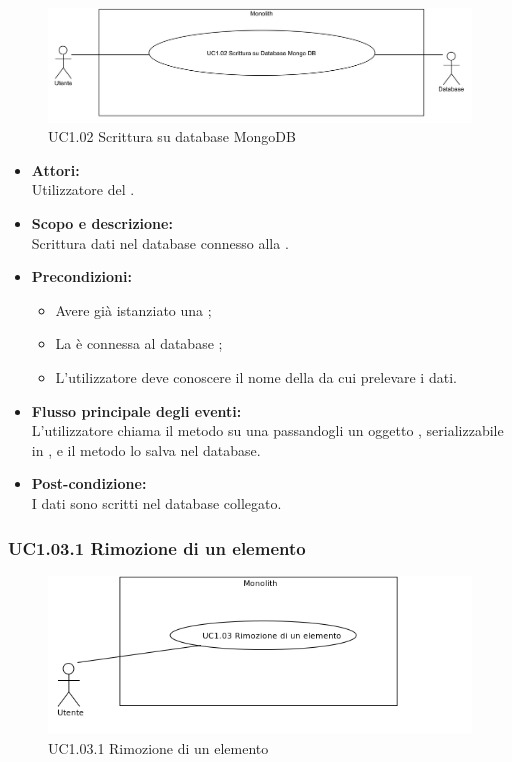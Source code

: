 \begin{figure}[H]
	\centering
	\includegraphics[width=15cm]{../../documenti/AnalisiDeiRequisiti/Diagrammi_img/uc1_02.png}
	\caption{UC1.02 Scrittura su database MongoDB}
\end{figure}

\begin{itemize}
\item \textbf{Attori:}
\\Utilizzatore del .
\item \textbf{Scopo e descrizione:} 
\\Scrittura dati nel database connesso alla .
\item \textbf{Precondizioni:}
\begin{itemize}
	\item Avere già istanziato una ;
	\item La  è connessa al database ;
	\item L'utilizzatore deve conoscere il nome della  da cui prelevare i dati.
\end{itemize}
\item \textbf{Flusso principale degli eventi:}
\\L'utilizzatore chiama il metodo su una  passandogli un oggetto , serializzabile in , e il metodo lo salva nel database.
\item \textbf{Post-condizione:}
\\I dati sono scritti nel database collegato.
\end{itemize}

\subsubsection{UC1.03.1 Rimozione di un elemento} \label{UC1.03.1}

\begin{figure}[H]
	\centering
	\includegraphics[width=15cm]{../../documenti/AnalisiDeiRequisiti/Diagrammi_img/uc1_03.png}
	\caption{UC1.03.1 Rimozione di un elemento}
\end{figure}

